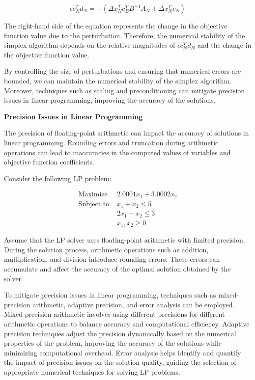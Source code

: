 \documentclass[12pt]{book} %
\begin{document}
\[
\epsilon c_N^Td_N = -(\Delta x_N^Tc_B^TB^{-1}A_N + \Delta x_N^Tc_N)
\]

The right-hand side of the equation represents the change in the objective function value due to the perturbation. Therefore, the numerical stability of the simplex algorithm depends on the relative magnitudes of $\epsilon c_N^Td_N$ and the change in the objective function value.

By controlling the size of perturbations and ensuring that numerical errors are bounded, we can maintain the numerical stability of the simplex algorithm. Moreover, techniques such as scaling and preconditioning can mitigate precision issues in linear programming, improving the accuracy of the solutions.

\textbf{Precision Issues in Linear Programming}

The precision of floating-point arithmetic can impact the accuracy of solutions in linear programming. Rounding errors and truncation during arithmetic operations can lead to inaccuracies in the computed values of variables and objective function coefficients.

Consider the following LP problem:


\begin{align*}
\text{Maximize } & 2.0001x_1 + 3.0002x_2 \\
\text{Subject to } & x_1 + x_2 \leq 5 \\
& 2x_1 - x_2 \leq 3 \\
& x_1, x_2 \geq 0
\end{align*}


Assume that the LP solver uses floating-point arithmetic with limited precision. During the solution process, arithmetic operations such as addition, multiplication, and division introduce rounding errors. These errors can accumulate and affect the accuracy of the optimal solution obtained by the solver.

To mitigate precision issues in linear programming, techniques such as mixed-precision arithmetic, adaptive precision, and error analysis can be employed. Mixed-precision arithmetic involves using different precisions for different arithmetic operations to balance accuracy and computational efficiency. Adaptive precision techniques adjust the precision dynamically based on the numerical properties of the problem, improving the accuracy of the solutions while minimizing computational overhead. Error analysis helps identify and quantify the impact of precision issues on the solution quality, guiding the selection of appropriate numerical techniques for solving LP problems.
\end{document}
